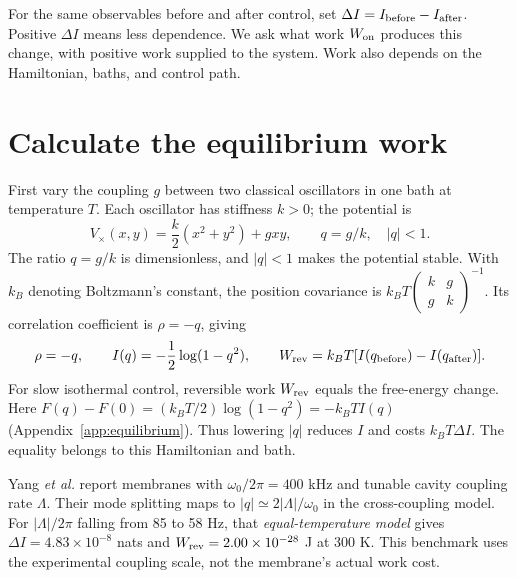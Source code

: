 \documentclass[10pt]{article}
\begin{document}
For the same observables before and after control, set $\Delta I=I_{\rm before}-I_{\rm after}$. Positive $\Delta I$ means less dependence. We ask what work $W_{\rm on}$ produces this change, with positive work supplied to the system. Work also depends on the Hamiltonian, baths, and control path.

\section{Calculate the equilibrium work}\label{sec:equilibrium}
First vary the coupling $g$ between two classical oscillators in one bath at temperature $T$. Each oscillator has stiffness $k>0$; the potential is
\begin{equation}
 V_\times(x,y)=\frac{k}{2}(x^2+y^2)+gxy,\qquad q=g/k,\quad |q|<1 . \label{eq:cross}
\end{equation}
The ratio $q=g/k$ is dimensionless, and $|q|<1$ makes the potential stable. With $k_B$ denoting Boltzmann's constant, the position covariance is $k_BT\left(\begin{smallmatrix}k&g\\g&k\end{smallmatrix}\right)^{-1}$. Its correlation coefficient is $\rho=-q$, giving
\begin{equation}
 \rho=-q,\qquad I(q)=-\frac12\log(1-q^2),\qquad
 W_{\rm rev}=k_BT[I(q_{\rm before})-I(q_{\rm after})].
 \label{eq:benchmark}
\end{equation}
For slow isothermal control, reversible work $W_{\rm rev}$ equals the free-energy change. Here $F(q)-F(0)=(k_BT/2)\log(1-q^2)=-k_BT I(q)$ (Appendix~\ref{app:equilibrium}). Thus lowering $|q|$ reduces $I$ and costs $k_BT\Delta I$. The equality belongs to this Hamiltonian and bath.

Yang \emph{et al.} report membranes with $\omega_0/2\pi=400$ kHz and tunable cavity coupling rate $\Lambda$.\cite{yang2020} Their mode splitting maps to $|q|\simeq2|\Lambda|/\omega_0$ in the cross-coupling model. For $|\Lambda|/2\pi$ falling from 85 to 58 Hz, that \emph{equal-temperature model} gives $\Delta I=4.83\times10^{-8}$ nats and $W_{\rm rev}=2.00\times10^{-28}$ J at 300 K. This benchmark uses the experimental coupling scale, not the membrane's actual work cost.
\end{document}
